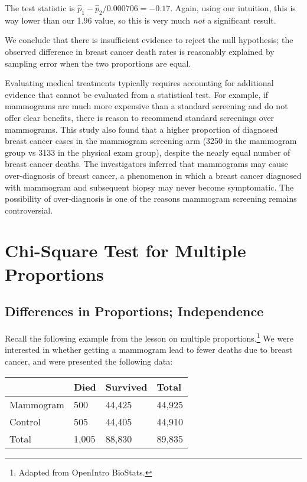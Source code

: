 \documentclass[
  letterpaper,
  DIV=11,
  numbers=noendperiod]{scrreprt}
\begin{document}
The test statistic is \(\hat p_1 - \hat p_2 / 0.000706 = -0.17\). Again,
using our intuition, this is way lower than our 1.96 value, so this is
very much \emph{not} a significant result.

We conclude that there is insufficient evidence to reject the null
hypothesis; the observed difference in breast cancer death rates is
reasonably explained by sampling error when the two proportions are
equal.

Evaluating medical treatments typically requires accounting for
additional evidence that cannot be evaluated from a statistical test.
For example, if mammograms are much more expensive than a standard
screening and do not offer clear benefits, there is reason to recommend
standard screenings over mammograms. This study also found that a higher
proportion of diagnosed breast cancer cases in the mammogram screening
arm (3250 in the mammogram group vs 3133 in the physical exam group),
despite the nearly equal number of breast cancer deaths. The
investigators inferred that mammograms may cause over-diagnosis of
breast cancer, a phenomenon in which a breast cancer diagnosed with
mammogram and subsequent biopsy may never become symptomatic. The
possibility of over-diagnosis is one of the reasons mammogram screening
remains controversial.

\hypertarget{chi-square-test-for-multiple-proportions}{%
\chapter{Chi-Square Test for Multiple
Proportions}\label{chi-square-test-for-multiple-proportions}}

\hypertarget{differences-in-proportions-independence}{%
\section{Differences in Proportions;
Independence}\label{differences-in-proportions-independence}}

Recall the following example from the lesson on multiple
proportions.\footnote{Adapted from OpenIntro BioStats.} We were
interested in whether getting a mammogram lead to fewer deaths due to
breast cancer, and were presented the following data:

\begin{longtable}[]{@{}llll@{}}
\toprule\noalign{}
& Died & Survived & Total \\
\midrule\noalign{}
\endhead
\bottomrule\noalign{}
\endlastfoot
Mammogram & 500 & 44,425 & 44,925 \\
Control & 505 & 44,405 & 44,910 \\
Total & 1,005 & 88,830 & 89,835 \\
\end{longtable}
\end{document}
